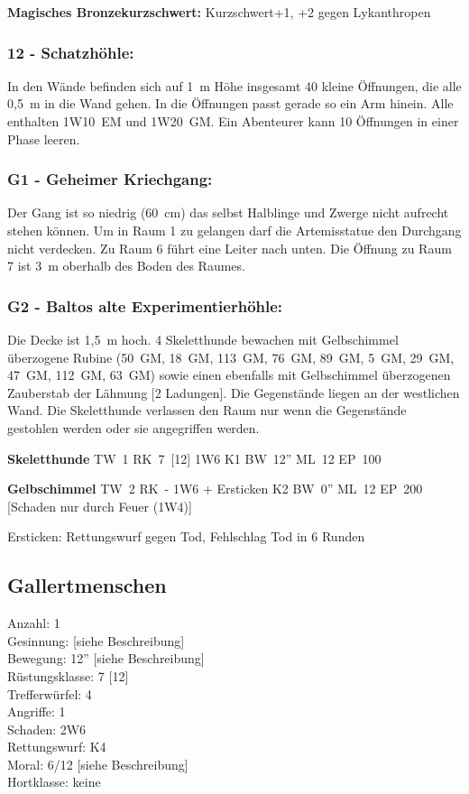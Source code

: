 \textbf{Magisches Bronzekurzschwert:} Kurzschwert+1, +2 gegen Lykanthropen

\subsubsection{12 - Schatzhöhle:} In den Wände befinden sich auf 1~m Höhe
insgesamt 40 kleine Öffnungen, die alle 0,5~m in die Wand gehen. In die
Öffnungen passt gerade so ein Arm hinein. Alle enthalten 1W10~EM und 1W20~GM.
Ein Abenteurer kann 10 Öffnungen in einer Phase leeren.

\subsubsection{G1 - Geheimer Kriechgang:} Der Gang ist so niedrig (60~cm) das selbst
Halblinge und Zwerge nicht aufrecht stehen können. Um in Raum 1 zu
gelangen darf die Artemisstatue den Durchgang nicht verdecken. Zu Raum
6 führt eine Leiter nach unten. Die Öffnung zu Raum 7 ist 3~m oberhalb
des Boden des Raumes.

\subsubsection{G2 - Baltos alte Experimentierhöhle:} Die Decke ist 1,5~m hoch. 4
Skeletthunde bewachen mit Gelbschimmel überzogene Rubine (50~GM, 18~GM,
113~GM, 76~GM, 89~GM, 5~GM, 29~GM, 47~GM, 112~GM, 63~GM) sowie einen ebenfalls
mit Gelbschimmel überzogenen Zauberstab der Lähmung [2 Ladungen]. Die
Gegenstände liegen an der westlichen Wand. Die Skeletthunde verlassen
den Raum nur wenn die Gegenstände gestohlen werden oder sie angegriffen
werden.

\textbf{Skeletthunde} TW~1 RK~7~[12] 1W6 K1 BW~12'' ML~12 EP~100 

\textbf{Gelbschimmel} TW~2 RK~- 1W6 + Ersticken K2 BW~0'' ML~12 EP~200 [Schaden
nur durch Feuer (1W4)]

Ersticken: Rettungswurf gegen Tod, Fehlschlag Tod in 6 Runden

\subsection{Gallertmenschen}

\begin{tabbing}
Anzahl: 1\\
Gesinnung: [siehe Beschreibung]\\
Bewegung: 12'' [siehe Beschreibung]\\
Rüstungsklasse: 7 [12]\\
Trefferwürfel: 4\\
Angriffe: 1\\
Schaden: 2W6\\
Rettungswurf: K4\\
Moral: 6/12 [siehe Beschreibung]\\
Hortklasse: keine\\
\end{tabbing}

